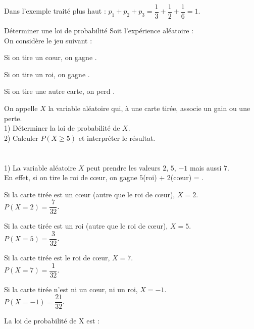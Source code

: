 \begin{bexemple}
    Dans l'exemple traité plus haut : $p_1 + p_2 + p_3 = \dfrac{1}{3} + \dfrac{1}{2} + \dfrac{1}{6} = 1$.
\end{bexemple}

\begin{bmethodet}{Déterminer une loi de probabilité}
    Soit l'expérience aléatoire : \\
    On considère le jeu suivant :
    \begin{itemMet}
        \item Si on tire un cœur, on gagne .
        \item Si on tire un roi, on gagne .
        \item Si on tire une autre carte, on perd .
    \end{itemMet}
    On appelle $X$ la variable aléatoire qui, à une carte tirée, associe un gain ou une perte.\\
    1) Déterminer la loi de probabilité de $X$.\\
    2) Calculer $P(X \geq 5)$ et interpréter le résultat.\\
    \\
    \\
    1) La variable aléatoire $X$ peut prendre les valeurs $2$, $5$, $-1$ mais aussi $7$.\\
    En effet, si on tire le roi de cœur, on gagne $5$(roi) + $2$(cœur) = .\\
    \begin{itemMet}
        \item Si la carte tirée est un cœur (autre que le roi de cœur), $X = 2$.\\
        $P(X = 2) = \dfrac{7}{32}$.
        \item Si la carte tirée est un roi (autre que le roi de cœur), $X = 5$.\\
        $P(X = 5) = \dfrac{3}{32}$.
        \item Si la carte tirée est le roi de cœur, $X = 7$.\\
        $P(X = 7) = \dfrac{1}{32}$.
        \item Si la carte tirée n'est ni un cœur, ni un roi, $X = -1$.\\
        $P(X = -1) = \dfrac{21}{32}$.
    \end{itemMet}
    La loi de probabilité de X est :\\
    \begin{tabular}{ | Xc | Xc | Xc | Xc | Xc |}

\end{tabular}
\end{bmethodet}
